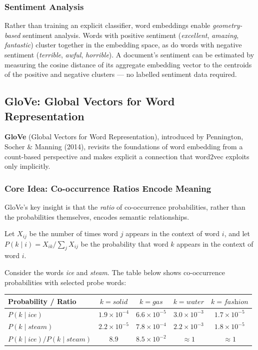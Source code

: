 \documentclass[11pt,a4paper]{article}
\newcommand{\term}[1]{\textcolor{DefGreen}{\textbf{#1}}}
\begin{document}
\subsubsection{Sentiment Analysis}

Rather than training an explicit classifier, word embeddings enable \emph{geometry-based} sentiment analysis. Words with positive sentiment (\textit{excellent}, \textit{amazing}, \textit{fantastic}) cluster together in the embedding space, as do words with negative sentiment (\textit{terrible}, \textit{awful}, \textit{horrible}). A document's sentiment can be estimated by measuring the cosine distance of its aggregate embedding vector to the centroids of the positive and negative clusters — no labelled sentiment data required.

\subsection{GloVe: Global Vectors for Word Representation}
\label{sec:glove}

\term{GloVe} (Global Vectors for Word Representation), introduced by Pennington, Socher \& Manning (2014), revisits the foundations of word embedding from a count-based perspective and makes explicit a connection that word2vec exploits only implicitly.

\subsubsection{Core Idea: Co-occurrence Ratios Encode Meaning}

GloVe's key insight is that the \emph{ratio} of co-occurrence probabilities, rather than the probabilities themselves, encodes semantic relationships.

Let $X_{ij}$ be the number of times word $j$ appears in the context of word $i$, and let $P(k \mid i) = X_{ik} / \sum_j X_{ij}$ be the probability that word $k$ appears in the context of word $i$.

Consider the words \textit{ice} and \textit{steam}. The table below shows co-occurrence probabilities with selected probe words:

\begin{center}
\renewcommand{\arraystretch}{1.25}
\begin{tabular}{lcccc}
\toprule
\textbf{Probability / Ratio} & $k=\textit{solid}$ & $k=\textit{gas}$ & $k=\textit{water}$ & $k=\textit{fashion}$ \\
\midrule
$P(k\mid\textit{ice})$           & $1.9\times10^{-4}$ & $6.6\times10^{-5}$ & $3.0\times10^{-3}$ & $1.7\times10^{-5}$ \\
$P(k\mid\textit{steam})$         & $2.2\times10^{-5}$ & $7.8\times10^{-4}$ & $2.2\times10^{-3}$ & $1.8\times10^{-5}$ \\
$P(k\mid\textit{ice})/P(k\mid\textit{steam})$ & $8.9$ & $8.5\times10^{-2}$ & $\approx 1$ & $\approx 1$ \\
\bottomrule
\end{tabular}
\end{center}
\end{document}

